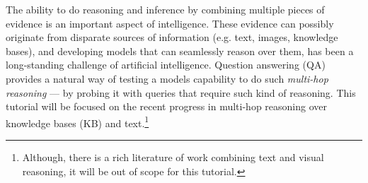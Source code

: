 The ability to do reasoning and inference by combining multiple pieces of evidence is an important aspect of intelligence. These evidence can possibly originate from disparate sources of information (e.g. text, images, knowledge bases), and developing models that can seamlessly reason over them, has been a long-standing challenge of artificial intelligence. Question answering (QA) provides a natural way of testing a models capability to do such \emph{multi-hop reasoning} --- by probing it with queries that require such kind of reasoning. This tutorial will be focused on the recent progress in multi-hop reasoning over knowledge bases (KB) and text.\footnote{Although, there is a rich literature of work combining text and visual reasoning, it will be out of scope for this tutorial.}
